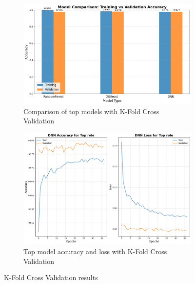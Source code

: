 \documentclass[12pt, a4paper]{article}
\begin{document}
\begin{figure}[!ht]
    \centering
    \begin{subfigure}[b]{0.7\textwidth}
        \centering
        \includegraphics[width=\textwidth]{figures/2_top_model_cross_val_comparison.png}
        \caption{Comparison of top models with K-Fold Cross Validation}
    \end{subfigure}
    \begin{subfigure}[b]{0.7\textwidth}
        \centering
        \includegraphics[width=\textwidth]{figures/2_top_model_cross_val_acc_loss.png}
        \caption{Top model accuracy and loss with K-Fold Cross Validation}
    \end{subfigure}
    \caption{K-Fold Cross Validation results}
    \label{fig:cross_val_comparison}
\end{figure}
\end{document}
